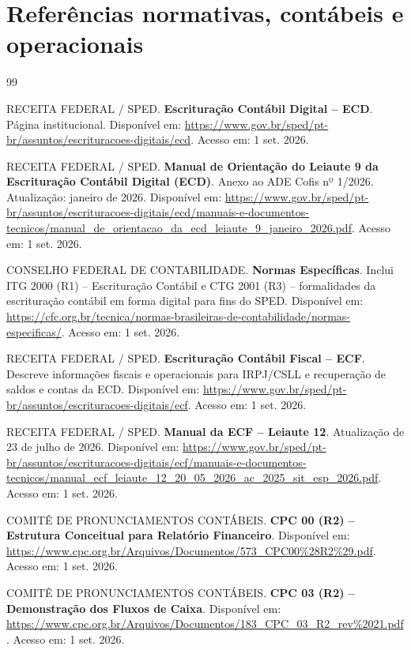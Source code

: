 \documentclass[11pt,a4paper]{article}
\begin{document}
\section{Referências normativas, contábeis e operacionais}

\small
\begin{thebibliography}{99}

RECEITA FEDERAL / SPED. \textbf{Escrituração Contábil Digital -- ECD}. Página institucional. Disponível em: \url{https://www.gov.br/sped/pt-br/assuntos/escrituracoes-digitais/ecd}. Acesso em: 1 set. 2026.

RECEITA FEDERAL / SPED. \textbf{Manual de Orientação do Leiaute 9 da Escrituração Contábil Digital (ECD)}. Anexo ao ADE Cofis nº 1/2026. Atualização: janeiro de 2026. Disponível em: \url{https://www.gov.br/sped/pt-br/assuntos/escrituracoes-digitais/ecd/manuais-e-documentos-tecnicos/manual_de_orientacao_da_ecd_leiaute_9_janeiro_2026.pdf}. Acesso em: 1 set. 2026.

CONSELHO FEDERAL DE CONTABILIDADE. \textbf{Normas Específicas}. Inclui ITG 2000 (R1) -- Escrituração Contábil e CTG 2001 (R3) -- formalidades da escrituração contábil em forma digital para fins do SPED. Disponível em: \url{https://cfc.org.br/tecnica/normas-brasileiras-de-contabilidade/normas-especificas/}. Acesso em: 1 set. 2026.

RECEITA FEDERAL / SPED. \textbf{Escrituração Contábil Fiscal -- ECF}. Descreve informações fiscais e operacionais para IRPJ/CSLL e recuperação de saldos e contas da ECD. Disponível em: \url{https://www.gov.br/sped/pt-br/assuntos/escrituracoes-digitais/ecf}. Acesso em: 1 set. 2026.

RECEITA FEDERAL / SPED. \textbf{Manual da ECF -- Leiaute 12}. Atualização de 23 de julho de 2026. Disponível em: \url{https://www.gov.br/sped/pt-br/assuntos/escrituracoes-digitais/ecf/manuais-e-documentos-tecnicos/manual_ecf_leiaute_12_20_05_2026_ac_2025_sit_esp_2026.pdf}. Acesso em: 1 set. 2026.

COMITÊ DE PRONUNCIAMENTOS CONTÁBEIS. \textbf{CPC 00 (R2) -- Estrutura Conceitual para Relatório Financeiro}. Disponível em: \url{https://www.cpc.org.br/Arquivos/Documentos/573_CPC00%28R2%29.pdf}. Acesso em: 1 set. 2026.

COMITÊ DE PRONUNCIAMENTOS CONTÁBEIS. \textbf{CPC 03 (R2) -- Demonstração dos Fluxos de Caixa}. Disponível em: \url{https://www.cpc.org.br/Arquivos/Documentos/183_CPC_03_R2_rev%2021.pdf}. Acesso em: 1 set. 2026.


\end{thebibliography}
\end{document}
